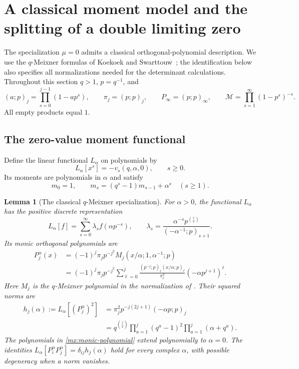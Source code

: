 \documentclass[11pt]{article}
\numberwithin{equation}{section}
\newtheorem{lemma}[lemma]{Lemma}
\theoremstyle{definition}
\theoremstyle{remark}
\begin{document}
\section{A classical moment model and the splitting of a double limiting zero}
\label{mx:section}

The specialization $\mu=0$ admits a classical orthogonal-polynomial
description.  We use the $q$-Meixner formulas of
Koekoek and Swarttouw~\cite[\S3.13]{KS}; the identification below also
specifies all normalizations needed for the determinant calculations.
Throughout this section $q>1$, $p=q^{-1}$, and
\begin{equation}\label{mx:notation}
 (a;p)_j=\prod_{s=0}^{j-1}(1-ap^s),\qquad
 \pi_j=(p;p)_j,\qquad
 P_\infty=(p;p)_\infty,\qquad
 \mathcal M=\prod_{s=1}^{\infty}(1-p^s)^{-s}.
\end{equation}
All empty products equal $1$.

\subsection{The zero-value moment functional}

Define the linear functional $L_\alpha$ on polynomials by
\begin{equation}\label{mx:functional}
 L_\alpha[x^s]=-v_s(q,\alpha,0),\qquad s\ge0.
\end{equation}
Its moments are polynomials in $\alpha$ and satisfy
\begin{equation}\label{mx:moment-recurrence}
 m_0=1,\qquad m_s=(q^s-1)m_{s-1}+\alpha^s\quad(s\ge1).
\end{equation}

\begin{lemma}[The classical $q$-Meixner specialization]\label{mx:meixner}
For $\alpha>0$, the functional $L_\alpha$ has the positive discrete
representation
\begin{equation}\label{mx:positive-measure}
 L_\alpha[f]
 =\sum_{s=0}^{\infty}\lambda_s f(\alpha p^{-s}),\qquad
 \lambda_s=
 \frac{\alpha^{-s}p^{\binom{s}{2}}}
 {(-\alpha^{-1};p)_{s+1}}.
\end{equation}
Its monic orthogonal polynomials are
\begin{align}
 P_j^\alpha(x)
 &=(-1)^j\pi_jp^{-j^2}
 M_j(x/\alpha;1,\alpha^{-1};p)\label{mx:monic-polynomial}\\
 &=(-1)^j\pi_jp^{-j^2}
 \sum_{\ell=0}^{j}
 \frac{(p^{-j};p)_\ell(x/\alpha;p)_\ell}{\pi_\ell^2}
 (-\alpha p^{j+1})^\ell.\nonumber
\end{align}
Here $M_j$ is the $q$-Meixner polynomial in the normalization of
\cite[\S3.13]{KS}.  Their squared norms are
\begin{align}
 h_j(\alpha):=L_\alpha[(P_j^\alpha)^2]
 &=\pi_j^2p^{-j(2j+1)}(-\alpha p;p)_j\label{mx:norm}\\
 &=q^{\binom j2}
 \prod_{a=1}^{j}(q^a-1)^2
 \prod_{a=1}^{j}(\alpha+q^a).\nonumber
\end{align}
The polynomials in \eqref{mx:monic-polynomial} extend polynomially to
$\alpha=0$.  The identities
$L_\alpha[P_i^\alpha P_j^\alpha]=\delta_{ij}h_j(\alpha)$
hold for every complex $\alpha$, with possible degeneracy when a norm
vanishes.
\end{lemma}
\end{document}
